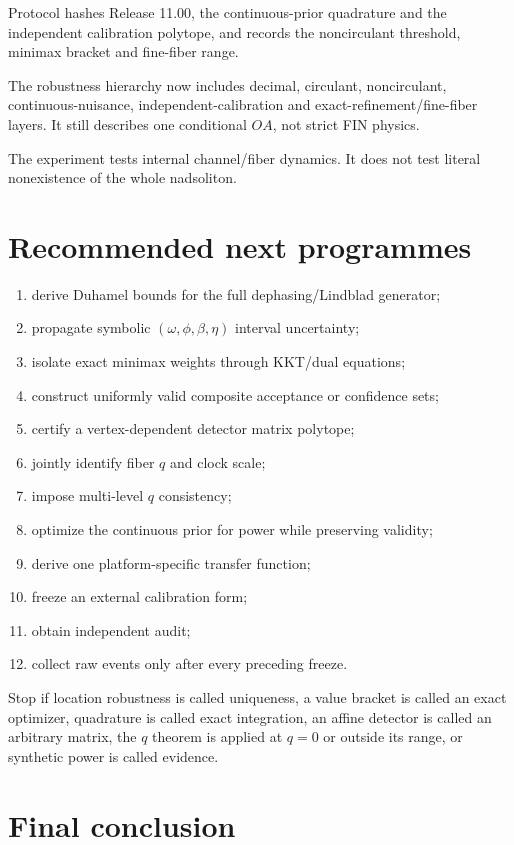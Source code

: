 \documentclass[11pt,a4paper]{article}
\begin{document}
Protocol  hashes Release 11.00,
the continuous-prior quadrature and the independent calibration polytope, and
records the noncirculant threshold, minimax bracket and fine-fiber range.

The robustness hierarchy now includes decimal, circulant, noncirculant,
continuous-nuisance, independent-calibration and exact-refinement/fine-fiber
layers.  It still describes one conditional $OA$, not strict FIN physics.

The experiment tests internal channel/fiber dynamics.  It does not test literal
nonexistence of the whole nadsoliton.

\section{Recommended next programmes}

\begin{enumerate}
\item derive Duhamel bounds for the full dephasing/Lindblad generator;
\item propagate symbolic $(\omega,\phi,\beta,\eta)$ interval uncertainty;
\item isolate exact minimax weights through KKT/dual equations;
\item construct uniformly valid composite acceptance or confidence sets;
\item certify a vertex-dependent detector matrix polytope;
\item jointly identify fiber $q$ and clock scale;
\item impose multi-level $q$ consistency;
\item optimize the continuous prior for power while preserving validity;
\item derive one platform-specific transfer function;
\item freeze an external calibration form;
\item obtain independent audit;
\item collect raw events only after every preceding freeze.
\end{enumerate}

Stop if location robustness is called uniqueness, a value bracket is called an
exact optimizer, quadrature is called exact integration, an affine detector is
called an arbitrary matrix, the $q$ theorem is applied at $q=0$ or outside its
range, or synthetic power is called evidence.

\section{Final conclusion}
\end{document}
